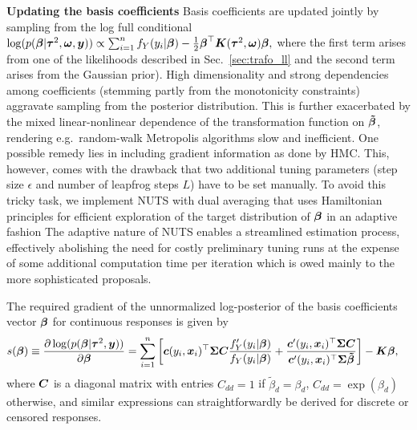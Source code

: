 \documentclass[12pt]{article}
\theoremstyle{plain}
\begin{document}
\noindent\textbf{Updating the basis coefficients}
Basis coefficients are updated jointly by sampling from the log full conditional
$
\log(p(\text{\boldmath$\beta$} |\text{\boldmath$\tau$}^2,\text{\boldmath$\omega$},\text{\boldmath$y$})) \propto \sum_{i=1}^n f_Y(y_i|\text{\boldmath$\beta$}) - \frac{1}{2} \text{\boldmath$\beta$}^\top \text{\boldmath$K$}(\text{\boldmath$\tau$}^2,\text{\boldmath$\omega$}) \text{\boldmath$\beta$},
$
where the first term arises from one of the likelihoods described in Sec.~\ref{sec:trafo_ll} and the second term arises from the Gaussian prior). High dimensionality and strong dependencies among  coefficients (stemming partly from the monotonicity constraints) aggravate sampling from the posterior distribution. This is further exacerbated by the mixed linear-nonlinear dependence of the transformation function on $\text{\boldmath$\tilde \beta$}$, rendering e.g.~random-walk Metropolis algorithms slow and inefficient. One possible remedy lies in including gradient information as done by HMC. This, however, comes with the drawback that two additional tuning parameters (step size $\epsilon$ and  number of leapfrog steps $L$) have to be set manually. To avoid this tricky task, we implement NUTS with dual averaging \citep{Nesterov2009} that uses Hamiltonian principles for efficient exploration of the target distribution of $\text{\boldmath$\beta$}$ in an adaptive fashion The adaptive nature of NUTS enables a streamlined estimation process, effectively abolishing the need for costly preliminary tuning runs at the expense of some additional computation time per iteration which is owed mainly to the more sophisticated proposals.

The required gradient of the unnormalized log-posterior of the basis coefficients vector $\text{\boldmath$\beta$}$ for continuous responses  is given by 
\begin{align*}
s(\text{\boldmath$\beta$})\equiv\frac{\partial\log(p(\text{\boldmath$\beta$}|\text{\boldmath$\tau$}^2,\text{\boldmath$y$}))}{\partial \text{\boldmath$\beta$}}  &=
\sum_{i=1}^n\left[\text{\boldmath$c$}(y_i,\text{\boldmath$x$}_i)^\top \mathbf{\Sigma} \text{\boldmath$C$}
\frac{f_Y^\prime(y_i|\text{\boldmath$\beta$})}{f_Y(y_i|\text{\boldmath$\beta$})} +
\frac{\text{\boldmath$c$}^\prime(y_i,\text{\boldmath$x$}_i)^\top \mathbf{\Sigma} \text{\boldmath$C$}}{\text{\boldmath$c$}^\prime(y_i,\text{\boldmath$x$}_i)^\top \mathbf{\Sigma}\text{\boldmath$\tilde \beta$}}\right] -  \text{\boldmath$K$} \text{\boldmath$\beta$},
\end{align*}
where $\text{\boldmath$C$}$ is a diagonal matrix with entries
$C_{dd} = 1$ if $\tilde{\beta}_{d} = \beta_{d}$,
    $C_{dd} =\exp(\beta_{d})$ otherwise,
and similar expressions can straightforwardly be derived for discrete or censored responses.
\end{document}
